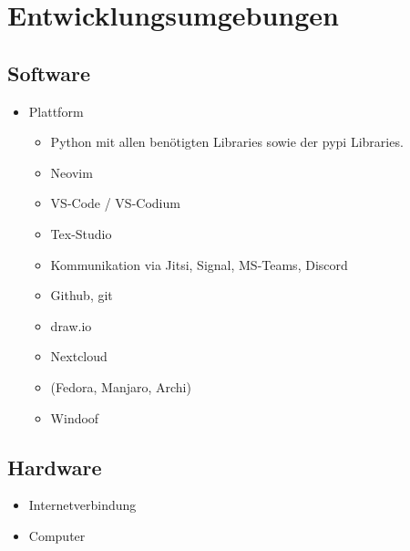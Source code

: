 \chapter{Entwicklungsumgebungen}

\section{Software}

\begin{itemize}
	\item Plattform
		\begin{itemize}
			\item Python mit allen benötigten Libraries sowie der pypi Libraries.
		\end{itemize}

		\begin{itemize}
			\item Neovim
			\item VS-Code / VS-Codium
			\item Tex-Studio
			\item Kommunikation via Jitsi, Signal, MS-Teams, Discord
			\item Github, git
			\item draw.io
			\item Nextcloud
			\item \Linux (Fedora, Manjaro, Archi) 
			\item Windoof
		\end{itemize}
\end{itemize}

\section{Hardware}

\begin{itemize}
	\item Internetverbindung
	\item Computer
\end{itemize}
